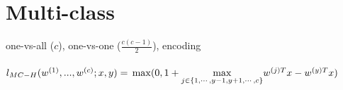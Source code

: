 \section*{Multi-class}
one-vs-all ($c$), one-vs-one ($\frac{c (c-1)}{2}$), encoding\\
\\
$l_{MC-H}(w^{(1)},...,w^{(c)};x,y) =\\
\max (0,1+\underset{j\in\{1,\cdots,y-1,y+1,\cdots,c\}}{\max} w^{(j)T} x - w^{(y)T} x)$